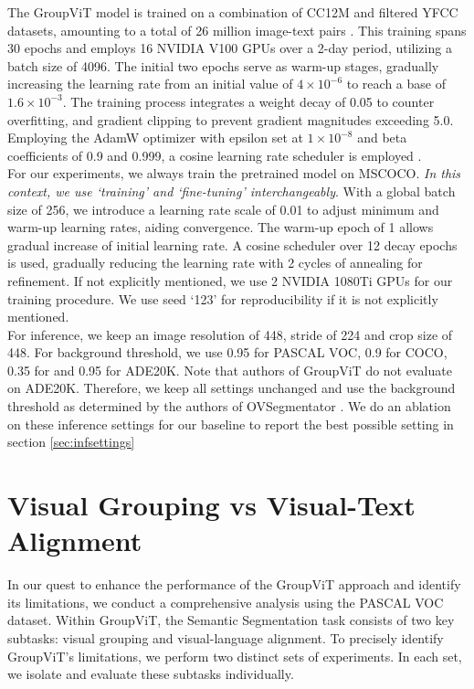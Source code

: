 The GroupViT model is trained on a combination of CC12M and filtered YFCC datasets, amounting to a total of 26 million image-text pairs \cite{changpinyo2021conceptual, thomee2016yfcc100m}. This training spans 30 epochs and employs 16 NVIDIA V100 GPUs over a 2-day period, utilizing a batch size of 4096. The initial two epochs serve as warm-up stages, gradually increasing the learning rate from an initial value of $4 \times 10^{-6}$ to reach a base of $1.6 \times 10^{-3}$. The training process integrates a weight decay of 0.05 to counter overfitting, and gradient clipping to prevent gradient magnitudes exceeding 5.0. Employing the AdamW optimizer with epsilon set at $1 \times 10^{-8}$ and beta coefficients of 0.9 and 0.999, a cosine learning rate scheduler is employed \cite{kingma2014adam, loshchilov2016sgdr}.\\
For our experiments, we always train the pretrained model on MSCOCO. \textit{In this context, we use `training' and `fine-tuning' interchangeably}. With a global batch size of 256, we introduce a learning rate scale of 0.01 to adjust minimum and warm-up learning rates, aiding convergence. The warm-up epoch of 1 allows gradual increase of initial learning rate. A cosine scheduler over 12 decay epochs is used, gradually reducing the learning rate with 2 cycles of annealing for refinement. If not explicitly mentioned, we use 2 NVIDIA 1080Ti GPUs for our training procedure. We use seed `123' for reproducibility if it is not explicitly mentioned.\\
For inference, we keep an image resolution of 448, stride of 224 and crop size of 448. For background threshold, we use 0.95 for PASCAL VOC, 0.9 for COCO, 0.35 for \pcon and 0.95 for ADE20K. Note that authors of GroupViT do not evaluate on ADE20K. Therefore, we keep all settings unchanged and use the background threshold as determined by the authors of OVSegmentator \cite{xu2023learning}. We  do an ablation on these inference settings for our baseline to report the best possible setting in section \ref{sec:infsettings}
% 
% 

\section{ Visual Grouping vs Visual-Text Alignment}
\label{sec:analyse}
In our quest to enhance the performance of the GroupViT approach and identify its limitations, we conduct a comprehensive analysis using the PASCAL VOC dataset. Within GroupViT, the Semantic Segmentation task consists of two key subtasks: visual grouping and visual-language alignment. To precisely identify GroupViT's limitations, we perform two distinct sets of experiments. In each set, we isolate and evaluate these subtasks individually.
